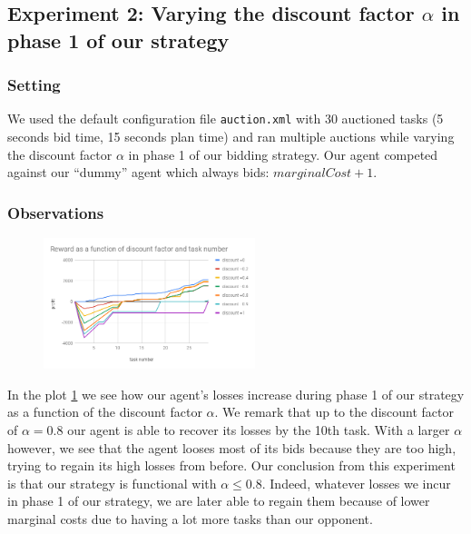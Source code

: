 \documentclass[11pt]{article}
\begin{document}
  \subsection{Experiment 2: Varying the discount factor $\alpha$ in phase 1 of
  our strategy}
  

  \subsubsection{Setting}
  
  We used the default configuration file \texttt{auction.xml} with 30 auctioned
  tasks (5 seconds bid time, 15 seconds plan time) and ran multiple auctions
  while varying the discount factor $\alpha$ in phase 1 of our bidding strategy.
  Our agent competed against our ``dummy'' agent which always bids:
  $marginalCost + 1$.

  \subsubsection{Observations}

\begin{figure}[htbp] 
	\centering
	\includegraphics[width=0.55\textwidth]{discount.png}
	\label{fig2}
\end{figure}
  

  In the plot \ref{fig2} we see how our agent's losses increase during phase 1 of our
  strategy as a function of the discount factor $\alpha$. We remark that up to
  the discount factor of $\alpha = 0.8$ our agent is able to recover its losses
  by the 10th task. With a larger $\alpha$ however, we see that the agent looses
  most of its bids because they are too high, trying to regain its high losses
  from before. Our conclusion from this experiment is that our strategy is
  functional with $\alpha \leq 0.8$. Indeed, whatever losses we incur in phase 1
  of our strategy, we are later able to regain them because of lower marginal
  costs due to having a lot more tasks than our opponent.
\end{document}
